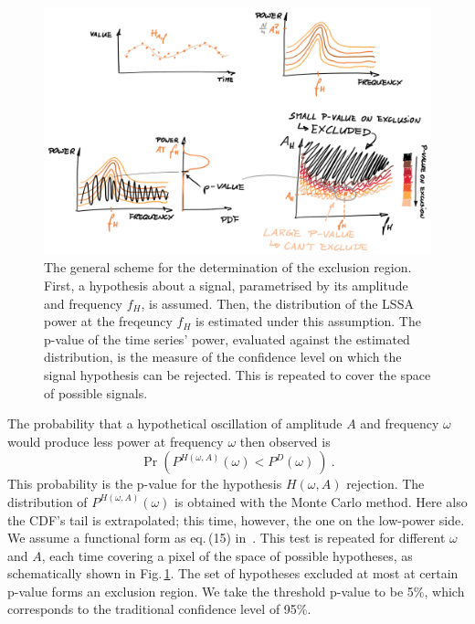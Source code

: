 \begin{figure}
  \centering \includegraphics[width=\linewidth]{gfx/axions/exclusion_region.png}
  \caption{The general scheme for the determination of the exclusion region. First, a hypothesis about a signal, parametrised by its amplitude and frequency $f_H$, is assumed. Then, the distribution of the LSSA power at the freqeuncy $f_H$ is estimated under this assumption. The p-value of the time series' power, evaluated against the estimated distribution, is the measure of the confidence level on which the signal hypothesis can be rejected. This is repeated to cover the space of possible signals.}\label{fig:exclusion_region}
\end{figure}

The probability that a hypothetical oscillation of amplitude $A$ and frequency $\omega$ would produce less power at frequency $\omega$ then observed is
\begin{equation}
  \Pr\left( P^{H(\omega, A)}(\omega) < P^D(\omega)\ \right) \ .
\end{equation}
This probability is the p-value for the hypothesis $H(\omega, A)$ rejection. The distribution of $P^{H(\omega, A)}(\omega)$ is obtained with the Monte Carlo method. Here also the CDF's tail is extrapolated; this time, however, the one on the low-power side. We assume a functional form as eq.\,(15) in~\cite{Scargle1982}. This test is repeated for different $\omega$ and $A$, each time covering a pixel of the space of possible hypotheses, as schematically shown in Fig.\,\ref{fig:exclusion_region}. The set of hypotheses excluded at most at certain p-value forms an exclusion region. We take the threshold p-value to be 5\%, which corresponds to the traditional confidence level of 95\%.

